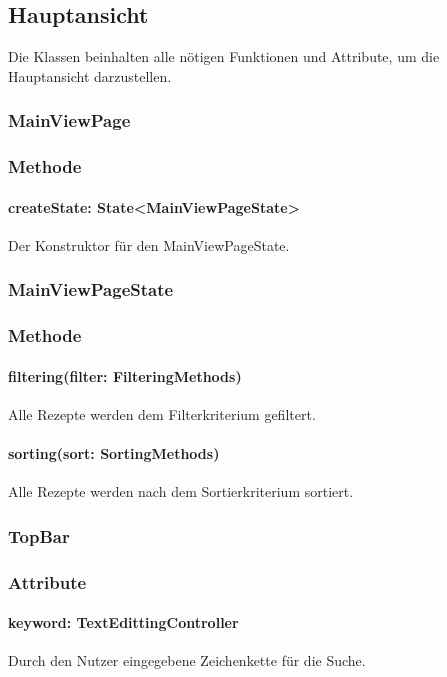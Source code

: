 \documentclass{entwurfsheft}
\begin{document}
\newpage

\subsection{Hauptansicht}
Die Klassen beinhalten alle nötigen Funktionen und Attribute, um die Hauptansicht darzustellen.

\subsubsection{MainViewPage}\label{sec:MainViewPage}
\subsubsection*{Methode}
\paragraph*{createState: State<MainViewPageState>} Der Konstruktor für den MainViewPageState.

\subsubsection{MainViewPageState}\label{sec:MainViewPageState}
\subsubsection*{Methode}

\paragraph*{filtering(filter: FilteringMethods)} Alle Rezepte werden dem Filterkriterium gefiltert.
\paragraph*{sorting(sort: SortingMethods)} Alle Rezepte werden nach dem Sortierkriterium sortiert.

\subsubsection{TopBar}\label{sec:TopBar}
\subsubsection*{Attribute}
\paragraph*{keyword: TextEdittingController} Durch den Nutzer eingegebene Zeichenkette für die Suche.
\end{document}
